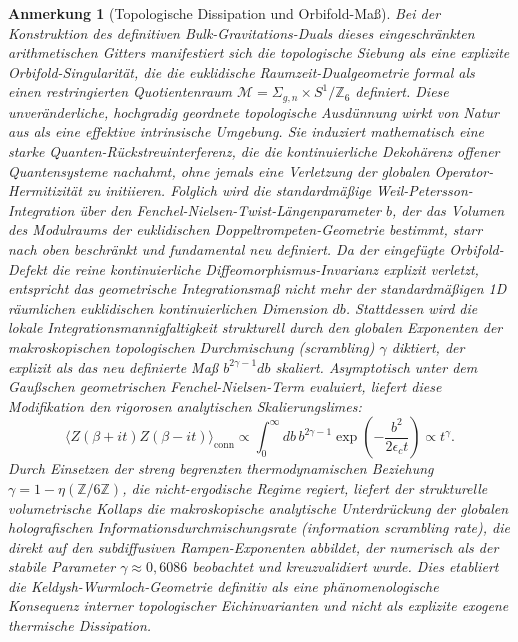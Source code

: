\documentclass[aps,prl,preprint,superscriptaddress,floatfix]{revtex4-2}
\newtheorem{remark}[theorem]{Anmerkung}
\newcommand{\Zmod}{\mathbb{Z}/6\mathbb{Z}}
\begin{document}
\begin{remark}[Topologische Dissipation und Orbifold-Maß]
\label{rem:keldysh}
Bei der Konstruktion des definitiven Bulk-Gravitations-Duals dieses eingeschränkten arithmetischen Gitters manifestiert sich die topologische Siebung als eine explizite Orbifold-Singularität, die die euklidische Raumzeit-Dualgeometrie formal als einen restringierten Quotientenraum $\mathcal{M} = \Sigma_{g,n} \times S^1 / \mathbb{Z}_6$ definiert.
Diese unveränderliche, hochgradig geordnete topologische Ausdünnung wirkt von Natur aus als eine effektive intrinsische Umgebung.
Sie induziert mathematisch eine starke Quanten-Rückstreuinterferenz, die die kontinuierliche Dekohärenz offener Quantensysteme nachahmt, ohne jemals eine Verletzung der globalen Operator-Hermitizität zu initiieren.
Folglich wird die standardmäßige Weil-Petersson-Integration über den Fenchel-Nielsen-Twist-Längenparameter $b$, der das Volumen des Modulraums der euklidischen Doppeltrompeten-Geometrie bestimmt, starr nach oben beschränkt und fundamental neu definiert.
Da der eingefügte Orbifold-Defekt die reine kontinuierliche Diffeomorphismus-Invarianz explizit verletzt, entspricht das geometrische Integrationsmaß nicht mehr der standardmäßigen 1D räumlichen euklidischen kontinuierlichen Dimension $db$.
Stattdessen wird die lokale Integrationsmannigfaltigkeit strukturell durch den globalen Exponenten der makroskopischen topologischen Durchmischung (\textit{scrambling}) $\gamma$ diktiert, der explizit als das neu definierte Maß $b^{2\gamma - 1} db$ skaliert. Asymptotisch unter dem Gaußschen geometrischen Fenchel-Nielsen-Term evaluiert, liefert diese Modifikation den rigorosen analytischen Skalierungslimes:
\begin{equation}
\langle Z(\beta + it) Z(\beta - it) \rangle_{\text{conn}} \propto \int_0^\infty db \, b^{2\gamma-1} \exp\left(-\frac{b^2}{2 \epsilon_c t}\right) \propto t^{\gamma}.
\end{equation}
Durch Einsetzen der streng begrenzten thermodynamischen Beziehung $\gamma = 1 - \eta(\Zmod)$, die nicht-ergodische Regime regiert, liefert der strukturelle volumetrische Kollaps die makroskopische analytische Unterdrückung der globalen holografischen Informationsdurchmischungsrate (\textit{information scrambling rate}), die direkt auf den subdiffusiven Rampen-Exponenten abbildet, der numerisch als der stabile Parameter $\gamma \approx 0,6086$ beobachtet und kreuzvalidiert wurde.
Dies etabliert die Keldysh-Wurmloch-Geometrie definitiv als eine phänomenologische Konsequenz interner topologischer Eichinvarianten und nicht als explizite exogene thermische Dissipation.


\end{remark}
\end{document}
